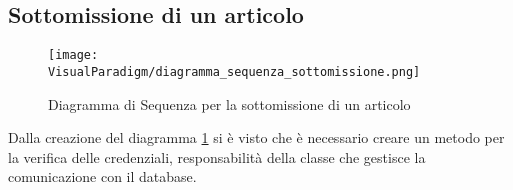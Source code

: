 \subsection{Sottomissione di un articolo}
\label{sec:sequenza_sottomissione}
\begin{figure}[ht]
  \centering
  \texttt{[image: VisualParadigm/diagramma\_sequenza\_sottomissione.png]}
  \caption{Diagramma di Sequenza per la sottomissione di un articolo}
  \label{fig:sottomissione}
\end{figure}

Dalla creazione del diagramma \ref{fig:sottomissione} si è visto che è
 necessario creare un metodo per la verifica delle credenziali, responsabilità della classe che gestisce la comunicazione con il database.
